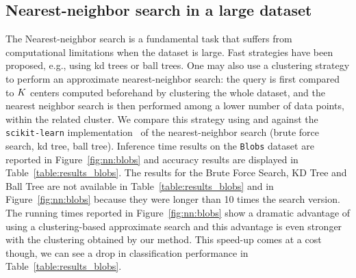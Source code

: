 \subsection{Nearest-neighbor search in a large dataset}
The Nearest-neighbor search is a fundamental task that suffers from computational limitations when the dataset is large.
Fast strategies have been proposed, e.g., using kd trees or ball trees.
One may also use a clustering strategy to perform an approximate nearest-neighbor search: the query is first compared to $K$ centers computed beforehand by clustering the whole dataset, and the nearest neighbor search is then performed among a lower number of data points, within the related cluster.
We compare this strategy using \kmeans and \qkmeans against the \texttt{scikit-learn} implementation~\cite{Pedregosa2011Scikit} of the nearest-neighbor search (brute force search, kd tree, ball tree).
Inference time results on the \texttt{Blobs} dataset are reported in Figure~\ref{fig:nn:blobs} and accuracy results are displayed in Table~\ref{table:results_blobs}. 
The results for the Brute Force Search, KD Tree and Ball Tree are not available in Table~\ref{table:results_blobs} and in Figure~\ref{fig:nn:blobs} because they were longer than 10 times the \kmeans search version.
The running times reported in Figure~\ref{fig:nn:blobs} show a dramatic advantage of using a clustering-based approximate search 
and this advantage is even stronger with the clustering obtained by our \qkmeans method. This speed-up comes at a cost though, we can see a drop in classification performance in Table~\ref{table:results_blobs}. 
% 


